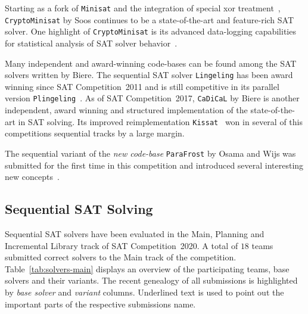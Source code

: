 \documentclass{elsarticle}
\newcommand{\solver}[1]{\texttt{#1}}
\begin{document}
Starting as a fork of \solver{Minisat} and the integration of special xor treatment~\cite{Soos:2009:Crypto}, \solver{CryptoMinisat} by Soos continues to be a state-of-the-art and feature-rich SAT solver. 
One highlight of \solver{CryptoMinisat} is its advanced data-logging capabilities for statistical analysis of SAT solver behavior~\cite{Soos:2019:ChrystalBall}.

Many independent and award-winning code-bases can be found among the SAT solvers written by Biere. 
The sequential SAT solver \solver{Lingeling} has been award winning since SAT Competition~2011 and is still competitive in its parallel version \solver{Plingeling}~\cite{Biere:2012:Lingeling}. 
As of SAT Competition~2017, \solver{CaDiCaL} %
by Biere is another independent, award winning and structured implementation of the state-of-the-art in SAT solving. 
Its improved reimplementation \solver{Kissat}~\cite{Biere:SC2020} won in several of this competitions sequential tracks by a large margin. 

The sequential variant of the \emph{new code-base} \solver{ParaFrost} by Osama and Wijs was submitted for the first time in this competition and introduced several interesting new concepts~\cite{Osama:SC2020:Parafrost}. 


\subsection{Sequential SAT Solving}
\label{sec:part:seq}

Sequential SAT solvers have been evaluated in the Main, Planning and Incremental Library track of SAT Competition~2020. 
A total of $18$ teams submitted correct solvers to the Main track of the competition. 
Table~\ref{tab:solvers-main} displays an overview of the participating teams, base solvers and their variants. 
The recent genealogy of all submissions is highlighted by \emph{base solver} and \emph{variant} columns. 
Underlined text is used to point out the important parts of the respective submissions name.
\end{document}
